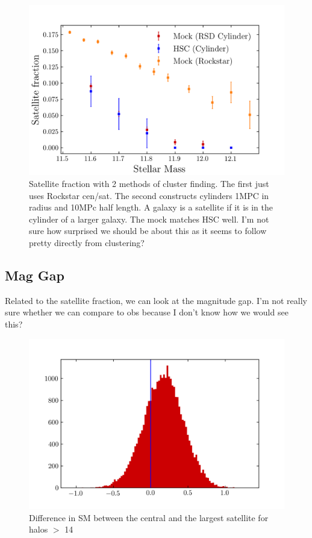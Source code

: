 \documentclass{article}
\begin{document}
\begin{figure}[h]
    \includegraphics[width=\textwidth]{images/sat_frac.png}
    \caption{Satellite fraction with 2 methods of cluster finding. The first just uses Rockstar cen/sat. The second constructs cylinders 1MPC in radius and 10MPc half length. A galaxy is a satellite if it is in the cylinder of a larger galaxy. The mock matches HSC well.
        I'm not sure how surprised we should be about this as it seems to follow pretty directly from clustering?
    \label{fig:sat_frac}
}
\end{figure}


\subsection{Mag Gap}
Related to the satellite fraction, we can look at the magnitude gap. I'm not really sure whether we can compare to obs because I don't know how we would see this?
\begin{figure}[h]
    \includegraphics[width=\textwidth]{images/mag_gap1.png}
    \caption{Difference in SM between the central and the largest satellite for halos $>$ 14}
\end{figure}
\end{document}
